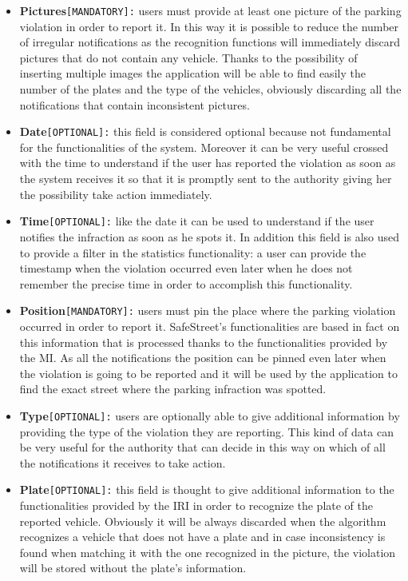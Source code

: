 		\begin{itemize}
			\item \textbf{Pictures}\texttt{[MANDATORY]:} users must provide at least one picture of the parking violation in order to report it. In this way it is possible to reduce the number of irregular notifications as the recognition functions will immediately discard pictures that do not contain any vehicle. Thanks to the possibility of inserting multiple images the application will be able to find easily the number of the plates and the type of the vehicles, obviously discarding all the notifications that contain inconsistent pictures.
			
			\item \textbf{Date}\texttt{[OPTIONAL]:} this field is considered optional because not fundamental for the functionalities of the system. Moreover it can be very useful crossed with the time to understand if the user has reported the violation as soon as the system receives it so that it is promptly sent to the authority giving her the possibility take action immediately.
			
			\item \textbf{Time}\texttt{[OPTIONAL]:} like the date it can be used to understand if the user notifies the infraction as soon as he spots it. In addition this field is also used to provide a filter in the statistics functionality: a user can provide the timestamp when the violation occurred even later when he does not remember the precise time in order to accomplish this functionality.
			
			\item \textbf{Position}\texttt{[MANDATORY]:} users must pin the place where the parking violation occurred in order to report it. SafeStreet's functionalities are based in fact on this information that is processed thanks to the functionalities provided by the MI. As all the notifications the position can be pinned even later when the violation is going to be reported and it will be used by the application to find the exact street where the parking infraction was spotted.
			
			\item \textbf{Type}\texttt{[OPTIONAL]:} users are optionally able to give additional information by providing the type of the violation they are reporting. This kind of data can be very useful for the authority that can decide in this way on which of all the notifications it receives to take action.
			
			\item \textbf{Plate}\texttt{[OPTIONAL]:} this field is thought to give additional information to the functionalities provided by the IRI in order to recognize the plate of the reported vehicle. Obviously it will be always discarded when the algorithm recognizes a vehicle that does not have a plate and in case inconsistency is found when matching it with the one recognized in the picture, the violation will be stored without the plate's information. 
		\end{itemize}
	
